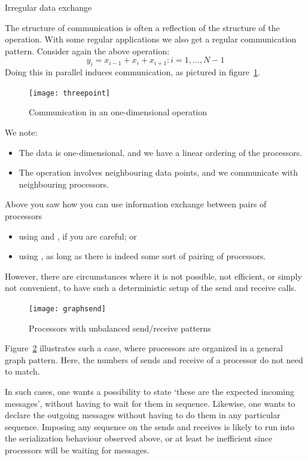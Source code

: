  {Irregular data exchange}

The structure of communication is often a reflection of the structure
of the operation.
With some regular applications we also get a regular communication pattern.
Consider again the above operation:
\[ y_i=x_{i-1}+x_i+x_{i+1}\colon i=1,\ldots,N-1 \]
Doing this in parallel induces communication, as pictured in figure~\ref{fig:3pt}.
%
\begin{figure}[ht]
  \texttt{[image: threepoint]}
  \caption{Communication in an one-dimensional operation}
  \label{fig:3pt}
\end{figure}
%
We note:
\begin{itemize}
\item The data is one-dimensional, and we have a linear ordering of the processors.
\item The operation involves neighbouring data points, and we communicate
  with neighbouring processors.
\end{itemize}

Above you saw how you can use information exchange between pairs of processors
\begin{itemize}
\item using  and , if you are careful; or
\item using , as long as there is indeed some sort of pairing of processors.
\end{itemize}
However, there are circumstances where it is not possible, not efficient, or simply not
convenient, to have such a deterministic setup of the send and receive calls.
%
\begin{figure}
  \texttt{[image: graphsend]}
  \caption{Processors with unbalanced send/receive patterns}
  \label{fig:graphsend}
\end{figure}
%
Figure~\ref{fig:graphsend} illustrates such a case, where processors are
organized in a general graph pattern. Here, the numbers of sends and receive
of a processor do not need to match.

In such cases, one wants a possibility to state `these are the expected incoming
messages', without having to wait for them in sequence. Likewise, one wants to declare
the outgoing messages without having to do them in any particular sequence.
Imposing any sequence on the sends and receives is likely to run into the serialization
behaviour observed above, or at least be inefficient since processors will be
waiting for messages.

